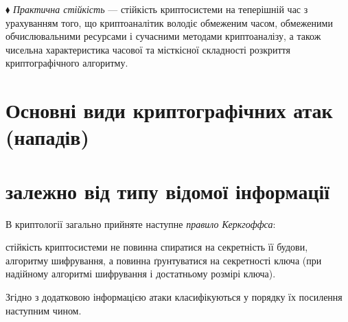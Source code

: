 $\blacklozenge$ \textit{Практична стійкість }--- стійкість криптосистеми на
теперішній час з урахуванням того, що криптоаналітик володіє обмеженим часом,
обмеженими обчислювальними ресурсами і сучасними методами криптоаналізу,  а
також чисельна характеристика часової та місткісної складності розкриття
криптографічного алгоритму. 


\bigskip


\bigskip

\section{Основні види криптографічних атак (нападів)}

\section{залежно від типу відомої інформації}


\bigskip


\bigskip

В криптології загально прийняте  наступне \textit{правило Керкгоффса}: 

 стійкість криптосистеми не повинна спиратися на секретність її будови,
алгоритму шифрування,  а повинна ґрунтуватися на секретності ключа (при
надійному алгоритмі шифрування і достатньому розмірі ключа). 

Згідно з додатковою інформацією атаки класифікуються у порядку їх посилення
наступним чином.


